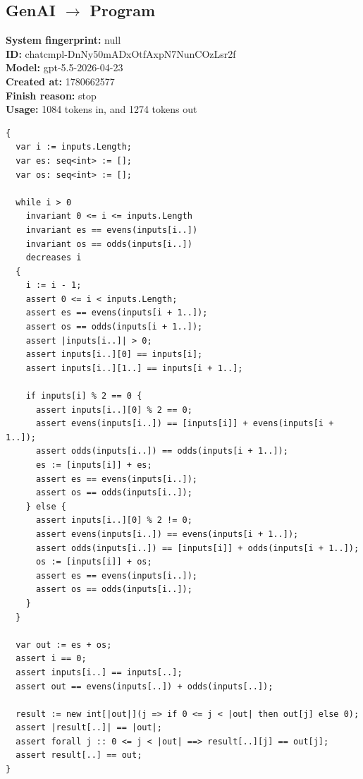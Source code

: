 \documentclass{article}
\begin{document}
\subsection*{GenAI $\rightarrow$ Program}
\textbf{System fingerprint: }null
\\\textbf{ID: }chatcmpl-DnNy50mADxOtfAxpN7NunCOzLsr2f
\\\textbf{Model: }gpt-5.5-2026-04-23
\\\textbf{Created at: }1780662577
\\\textbf{Finish reason: }stop
\\\textbf{Usage: }1084 tokens in, and 1274 tokens out
\begin{lstlisting}
{
  var i := inputs.Length;
  var es: seq<int> := [];
  var os: seq<int> := [];

  while i > 0
    invariant 0 <= i <= inputs.Length
    invariant es == evens(inputs[i..])
    invariant os == odds(inputs[i..])
    decreases i
  {
    i := i - 1;
    assert 0 <= i < inputs.Length;
    assert es == evens(inputs[i + 1..]);
    assert os == odds(inputs[i + 1..]);
    assert |inputs[i..]| > 0;
    assert inputs[i..][0] == inputs[i];
    assert inputs[i..][1..] == inputs[i + 1..];

    if inputs[i] % 2 == 0 {
      assert inputs[i..][0] % 2 == 0;
      assert evens(inputs[i..]) == [inputs[i]] + evens(inputs[i + 1..]);
      assert odds(inputs[i..]) == odds(inputs[i + 1..]);
      es := [inputs[i]] + es;
      assert es == evens(inputs[i..]);
      assert os == odds(inputs[i..]);
    } else {
      assert inputs[i..][0] % 2 != 0;
      assert evens(inputs[i..]) == evens(inputs[i + 1..]);
      assert odds(inputs[i..]) == [inputs[i]] + odds(inputs[i + 1..]);
      os := [inputs[i]] + os;
      assert es == evens(inputs[i..]);
      assert os == odds(inputs[i..]);
    }
  }

  var out := es + os;
  assert i == 0;
  assert inputs[i..] == inputs[..];
  assert out == evens(inputs[..]) + odds(inputs[..]);

  result := new int[|out|](j => if 0 <= j < |out| then out[j] else 0);
  assert |result[..]| == |out|;
  assert forall j :: 0 <= j < |out| ==> result[..][j] == out[j];
  assert result[..] == out;
}
\end{lstlisting}
\end{document}
